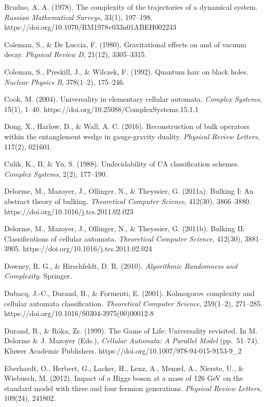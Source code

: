 \documentclass[
]{article}
\begin{document}
Brudno, A. A. (1978). The complexity of the trajectories of a dynamical
system. \emph{Russian Mathematical Surveys}, 33(1), 197--198.
https://doi.org/10.1070/RM1978v033n01ABEH002243

Coleman, S., \& De Luccia, F. (1980). Gravitational effects on and of
vacuum decay. \emph{Physical Review D}, 21(12), 3305--3315.

Coleman, S., Preskill, J., \& Wilczek, F. (1992). Quantum hair on black
holes. \emph{Nuclear Physics B}, 378(1--2), 175--246.

Cook, M. (2004). Universality in elementary cellular automata.
\emph{Complex Systems}, 15(1), 1--40.
https://doi.org/10.25088/ComplexSystems.15.1.1

Dong, X., Harlow, D., \& Wall, A. C. (2016). Reconstruction of bulk
operators within the entanglement wedge in gauge-gravity duality.
\emph{Physical Review Letters}, 117(2), 021601.

Culik, K., II, \& Yu, S. (1988). Undecidability of CA classification
schemes. \emph{Complex Systems}, 2(2), 177--190.

Delorme, M., Mazoyer, J., Ollinger, N., \& Theyssier, G. (2011a).
Bulking I: An abstract theory of bulking. \emph{Theoretical Computer
Science}, 412(30), 3866--3880. https://doi.org/10.1016/j.tcs.2011.02.023

Delorme, M., Mazoyer, J., Ollinger, N., \& Theyssier, G. (2011b).
Bulking II: Classifications of cellular automata. \emph{Theoretical
Computer Science}, 412(30), 3881--3905.
https://doi.org/10.1016/j.tcs.2011.02.024

Downey, R. G., \& Hirschfeldt, D. R. (2010). \emph{Algorithmic
Randomness and Complexity}. Springer.

Dubacq, J.-C., Durand, B., \& Formenti, E. (2001). Kolmogorov complexity
and cellular automata classification. \emph{Theoretical Computer
Science}, 259(1--2), 271--285.
https://doi.org/10.1016/S0304-3975(00)00012-8

Durand, B., \& Róka, Zs. (1999). The Game of Life: Universality
revisited. In M. Delorme \& J. Mazoyer (Eds.), \emph{Cellular Automata:
A Parallel Model} (pp.~51--74). Kluwer Academic Publishers.
https://doi.org/10.1007/978-94-015-9153-9\_2

Eberhardt, O., Herbert, G., Lacker, H., Lenz, A., Menzel, A., Nierste,
U., \& Wiebusch, M. (2012). Impact of a Higgs boson at a mass of 126 GeV
on the standard model with three and four fermion generations.
\emph{Physical Review Letters}, 109(24), 241802.
\end{document}
